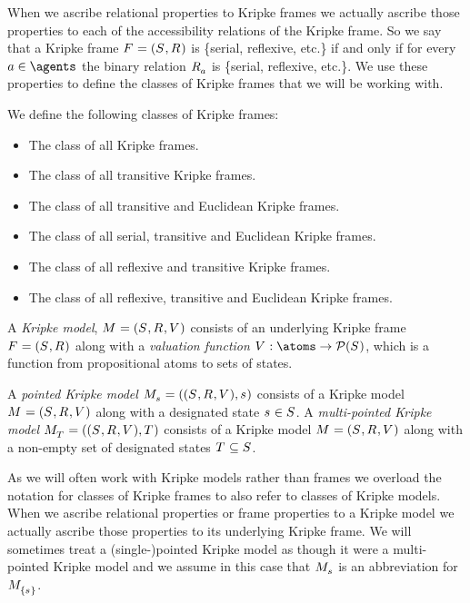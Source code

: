 When we ascribe relational properties to Kripke frames we actually ascribe those properties to each of the accessibility relations of the Kripke frame.
So we say that a Kripke frame $\kFrameAndTuple$ is \{serial, reflexive, etc.\} if and only if for every $\agentA \in \agents$ the binary relation $\kAccessibilityA$ is \{serial, reflexive, etc.\}.
We use these properties to define the classes of Kripke frames that we will be working with.

\begin{definition}
We define the following classes of Kripke frames:
\begin{itemize}
    \item The class \classK{} of all Kripke frames.
    \item The class \classKF{} of all transitive Kripke frames.
    \item The class \classKFF{} of all transitive and Euclidean Kripke frames.
    \item The class \classKD{} of all serial, transitive and Euclidean Kripke frames.
    \item The class \classSF{} of all reflexive and transitive Kripke frames.
    \item The class \classS{} of all reflexive, transitive and Euclidean Kripke frames.
\end{itemize}
\end{definition}

\begin{definition}
A {\em Kripke model}, $\kModelAndTuple$ consists of an underlying Kripke frame $\kFrameAndTuple$ along with a {\em valuation function} $\kValuation : \atoms \to \powerset(\kStates)$, which is a function from propositional atoms to sets of states.

A {\em pointed Kripke model} $\kPModelAndTuple{\kStateS}$ consists of a Kripke model $\kModelAndTuple$ along with a designated state $\kStateS \in \kStates$.
A {\em multi-pointed Kripke model} $\kPModelAndTuple{\kStatesT}$ consists of a Kripke model $\kModelAndTuple$ along with a non-empty set of designated states $\kStatesT \subseteq \kStates$.
\end{definition}

As we will often work with Kripke models rather than frames we overload the notation for classes of Kripke frames to also refer to classes of Kripke models.
When we ascribe relational properties or frame properties to a Kripke model we actually ascribe those properties to its underlying Kripke frame.
We will sometimes treat a (single-)pointed Kripke model as though it were a multi-pointed Kripke model and we assume in this case that $\kPModel{\kStateS}$ is an abbreviation for $\kPModel{\{\kStateS\}}$.

